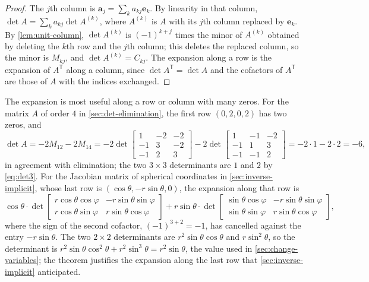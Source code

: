 \begin{proof}
The $j$th column is $\mathbf a_j=\sum_ka_{kj}\mathbf e_k$. By linearity in that column, $\det A=\sum_ka_{kj}\det A^{(k)}$, where $A^{(k)}$ is $A$ with its $j$th column replaced by $\mathbf e_k$. By \cref{lem:unit-column}, $\det A^{(k)}$ is $(-1)^{k+j}$ times the minor of $A^{(k)}$ obtained by deleting the $k$th row and the $j$th column; this deletes the replaced column, so the minor is $M_{kj}$, and $\det A^{(k)}=C_{kj}$. The expansion along a row is the expansion of $A^{\mathsf T}$ along a column, since $\det A^{\mathsf T}=\det A$ and the cofactors of $A^{\mathsf T}$ are those of $A$ with the indices exchanged.
\end{proof}

The expansion is most useful along a row or column with many zeros. For the matrix $A$ of order $4$ in \cref{sec:det-elimination}, the first row $(0,2,0,2)$ has two zeros, and
\[
\det A=-2M_{12}-2M_{14}=-2\det\begin{bmatrix}1&-2&-2\\-1&3&-2\\-1&2&3\end{bmatrix}-2\det\begin{bmatrix}1&-1&-2\\-1&1&3\\-1&-1&2\end{bmatrix}=-2\cdot1-2\cdot2=-6,
\]
in agreement with elimination; the two $3\times3$ determinants are $1$ and $2$ by \eqref{eq:det3}. For the Jacobian matrix of spherical coordinates in \cref{sec:inverse-implicit}, whose last row is $(\cos\theta,-r\sin\theta,0)$, the expansion along that row is
\[
\cos\theta\cdot\det\begin{bmatrix}r\cos\theta\cos\varphi&-r\sin\theta\sin\varphi\\r\cos\theta\sin\varphi&r\sin\theta\cos\varphi\end{bmatrix}+r\sin\theta\cdot\det\begin{bmatrix}\sin\theta\cos\varphi&-r\sin\theta\sin\varphi\\\sin\theta\sin\varphi&r\sin\theta\cos\varphi\end{bmatrix},
\]
where the sign of the second cofactor, $(-1)^{3+2}=-1$, has cancelled against the entry $-r\sin\theta$. The two $2\times2$ determinants are $r^2\sin\theta\cos\theta$ and $r\sin^2\theta$, so the determinant is $r^2\sin\theta\cos^2\theta+r^2\sin^3\theta=r^2\sin\theta$, the value used in \cref{sec:change-variables}; the theorem justifies the expansion along the last row that \cref{sec:inverse-implicit} anticipated.

